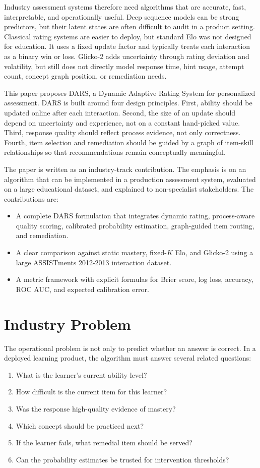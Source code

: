 \documentclass[conference]{IEEEtran}
\begin{document}
Industry assessment systems therefore need algorithms that are accurate, fast, interpretable, and operationally useful. Deep sequence models can be strong predictors, but their latent states are often difficult to audit in a product setting. Classical rating systems are easier to deploy, but standard Elo was not designed for education. It uses a fixed update factor and typically treats each interaction as a binary win or loss. Glicko-2 adds uncertainty through rating deviation and volatility, but still does not directly model response time, hint usage, attempt count, concept graph position, or remediation needs.

This paper proposes DARS, a Dynamic Adaptive Rating System for personalized assessment. DARS is built around four design principles. First, ability should be updated online after each interaction. Second, the size of an update should depend on uncertainty and experience, not on a constant hand-picked value. Third, response quality should reflect process evidence, not only correctness. Fourth, item selection and remediation should be guided by a graph of item-skill relationships so that recommendations remain conceptually meaningful.

The paper is written as an industry-track contribution. The emphasis is on an algorithm that can be implemented in a production assessment system, evaluated on a large educational dataset, and explained to non-specialist stakeholders. The contributions are:
\begin{itemize}
    \item A complete DARS formulation that integrates dynamic rating, process-aware quality scoring, calibrated probability estimation, graph-guided item routing, and remediation.
    \item A clear comparison against static mastery, fixed-$K$ Elo, and Glicko-2 using a large ASSISTments 2012-2013 interaction dataset.
    \item A metric framework with explicit formulas for Brier score, log loss, accuracy, ROC AUC, and expected calibration error.
\end{itemize}

\section{Industry Problem}
The operational problem is not only to predict whether an answer is correct. In a deployed learning product, the algorithm must answer several related questions:
\begin{enumerate}
    \item What is the learner's current ability level?
    \item How difficult is the current item for this learner?
    \item Was the response high-quality evidence of mastery?
    \item Which concept should be practiced next?
    \item If the learner fails, what remedial item should be served?
    \item Can the probability estimates be trusted for intervention thresholds?
\end{enumerate}
\end{document}
